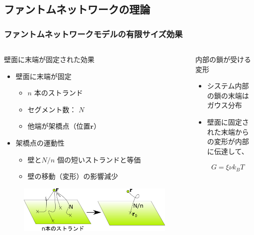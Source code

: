 \documentclass[11pt, dvipdfmx]{beamer}
\begin{document}
\subsection{ファントムネットワークの理論}
\begin{frame}
\frametitle{ファントムネットワークモデルの有限サイズ効果}
\begin{columns}[totalwidth=1\textwidth]
\begin{block}{壁面に末端が固定された効果}
\begin{itemize}
\item
壁面に末端が固定
	\begin{itemize}
	\item  
	$n$ 本のストランド
	\item
	セグメント数： $N$
	\item
	他端が架橋点（位置$\bm{r}$）
	\end{itemize}
\item
架橋点の運動性
	\begin{itemize}
	\item  
	壁と$N/n$ 個の短いストランドと等価
	\item
	壁の移動（変形）の影響減少
	\end{itemize}
\end{itemize}
\vspace{-2mm}
\begin{figure}
\centering
\includegraphics[width=\textwidth]{./fig/phantom-1.png}
\end{figure}
\end{block}
\begin{exampleblock}{内部の鎖が受ける変形}
\begin{itemize}
\item
システム内部の鎖の末端はガウス分布
\item
壁面に固定された末端からの変形が内部に伝達して、
\end{itemize}
\vspace{-5mm}
\tiny
\begin{align*}
&G=\xi \nu k_BT \\

\end{align*}
\end{exampleblock}
\end{columns}
\end{frame}
\end{document}
